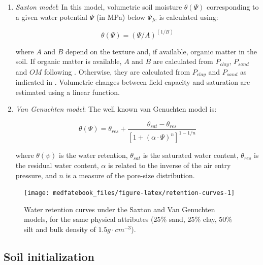 \documentclass[]{book}
\providecommand{\tightlist}{%
  \setlength{\itemsep}{0pt}\setlength{\parskip}{0pt}}
\begin{document}
\begin{enumerate}
\def\labelenumi{\arabic{enumi}.}
\tightlist
\item
  \emph{Saxton model}: In this model, volumetric soil moisture
  \(\theta(\Psi)\) corresponding to a given water potential \(\Psi\) (in
  MPa) below \(\Psi_{fc}\) is calculated using:

  \begin{equation}\theta(\Psi) = (\Psi/A)^{(1/B)}\end{equation}

  where \(A\) and \(B\) depend on the texture and, if available, organic
  matter in the soil. If organic matter is available, \(A\) and \(B\)
  are calculated from \(P_{clay}\), \(P_{sand}\) and \(OM\) following
  \citet{Saxton2006}. Otherwise, they are calculated from \(P_{clay}\)
  and \(P_{sand}\) as indicated in \citet{Saxton1986}. Volumetric
  changes between field capacity and saturation are estimated using a
  linear function.
\item
  \emph{Van Genuchten model}: The well known van Genuchten
  \citeyearpar{Genuchten1980} model is:

  \begin{equation}\theta(\Psi) = \theta_{res}+\frac{\theta_{sat}-\theta_{res}}{\left[1+ (\alpha \cdot \Psi)^n \right]^{1-1/n}}\end{equation}

  where \(\theta(\psi)\) is the water retention, \(\theta_{sat}\) is the
  saturated water content, \(\theta_{res}\) is the residual water
  content, \(\alpha\) is related to the inverse of the air entry
  pressure, and \(n\) is a measure of the pore-size distribution.
\end{enumerate}





\begin{figure}

{\centering \texttt{[image: medfatebook\_files/figure-latex/retention-curves-1]} 

}

\caption{Water retention curves under the Saxton and
Van Genuchten models, for the same physical attributes (25\% sand, 25\%
clay, 50\% silt and bulk density of \(1.5 g \cdot cm^{-3}\)).}\label{fig:retention-curves}
\end{figure}

\subsection{Soil initialization}\label{soil-initialization}
\end{document}
